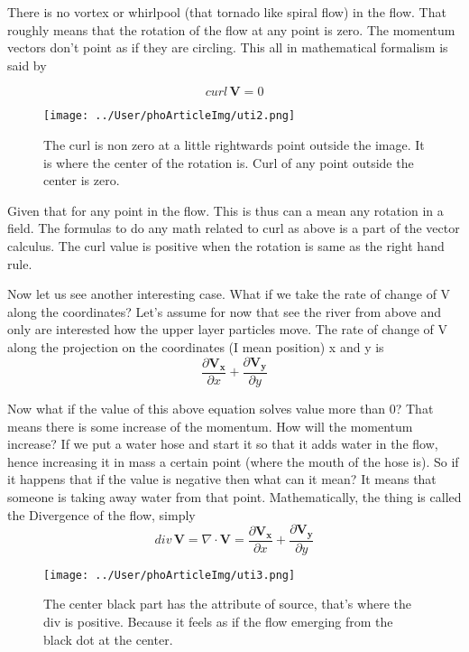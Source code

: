 \documentclass[11pt,a4paper]{article}
\renewcommand{\vec}[1]{\boldsymbol{#1}}
\begin{document}
There is no vortex or whirlpool (that tornado like spiral flow) in the flow. That roughly means that the rotation of the flow at any point is zero. The momentum vectors don't point as if they are circling. This all in mathematical formalism is said by 

	\begin{equation}
	curl \, \vec{V} = 0
	\end{equation}

\begin{figure}[hbtp]
\centering
\texttt{[image: ../User/phoArticleImg/uti2.png]}
\caption{The curl is non zero at a little rightwards point outside the image. It is where the center of the rotation is. Curl of any point outside the center is zero.}
\end{figure}


Given that for any point in the flow. This is thus can a mean any rotation in a field. The formulas to do any math related to curl as above is a part of the vector calculus. The curl value is positive when the rotation is same as the right hand rule. 


Now let us see another interesting case. What if we take the rate of change of V along the coordinates? Let's assume for now that see the river from above and only are interested how the upper layer particles move. The rate of change of V along the projection on the coordinates (I mean position) x and y is 
	\begin{equation}
	 \frac{\partial \vec{V_x}}{\partial x} +
	  \frac{\partial \vec{V_y}}{\partial y}
	\end{equation}


Now what if the value of this above equation solves value more than 0? That means there is some increase of the momentum. How will the momentum increase? If we put a water hose and start it so that it adds water in the flow, hence increasing it in mass a certain point (where the mouth of the hose is). So if it happens that if the value is negative then what can it mean? It means that someone is taking away water from that point. Mathematically, the thing is called the Divergence of the flow, simply
	\begin{equation}
	div \, \vec{V} = \nabla \cdot \vec{V} = 	
	 \frac{\partial \vec{V_x}}{\partial x} +
	  \frac{\partial \vec{V_y}}{\partial y}
	\end{equation}

\begin{figure}[hbtp]
\centering
\texttt{[image: ../User/phoArticleImg/uti3.png]}
\caption{The center black part has the attribute of source, that's where the div is positive. Because it feels as if the flow emerging from the black dot at the center.}
\end{figure}
\end{document}
